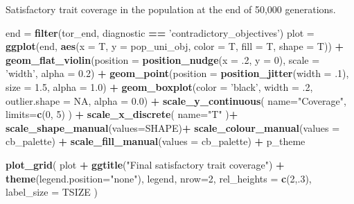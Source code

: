 \documentclass[]{book}
\newenvironment{Shaded}{\begin{snugshade}}{\end{snugshade}}
\newcommand{\DataTypeTok}[1]{\textcolor[rgb]{0.13,0.29,0.53}{#1}}
\newcommand{\DecValTok}[1]{\textcolor[rgb]{0.00,0.00,0.81}{#1}}
\newcommand{\FloatTok}[1]{\textcolor[rgb]{0.00,0.00,0.81}{#1}}
\newcommand{\KeywordTok}[1]{\textcolor[rgb]{0.13,0.29,0.53}{\textbf{#1}}}
\newcommand{\NormalTok}[1]{#1}
\newcommand{\OperatorTok}[1]{\textcolor[rgb]{0.81,0.36,0.00}{\textbf{#1}}}
\newcommand{\OtherTok}[1]{\textcolor[rgb]{0.56,0.35,0.01}{#1}}
\newcommand{\StringTok}[1]{\textcolor[rgb]{0.31,0.60,0.02}{#1}}
\begin{document}
Satisfactory trait coverage in the population at the end of 50,000 generations.

\begin{Shaded}
\begin{Highlighting}[]
\NormalTok{end =}\StringTok{ }\KeywordTok{filter}\NormalTok{(tor_end, diagnostic }\OperatorTok{==}\StringTok{ 'contradictory_objectives'}\NormalTok{)}
\NormalTok{plot =}\StringTok{ }\KeywordTok{ggplot}\NormalTok{(end, }\KeywordTok{aes}\NormalTok{(}\DataTypeTok{x =}\NormalTok{ T, }\DataTypeTok{y =}\NormalTok{ pop_uni_obj, }\DataTypeTok{color =}\NormalTok{ T, }\DataTypeTok{fill =}\NormalTok{ T, }\DataTypeTok{shape =}\NormalTok{ T)) }\OperatorTok{+}
\StringTok{  }\KeywordTok{geom_flat_violin}\NormalTok{(}\DataTypeTok{position =} \KeywordTok{position_nudge}\NormalTok{(}\DataTypeTok{x =} \FloatTok{.2}\NormalTok{, }\DataTypeTok{y =} \DecValTok{0}\NormalTok{), }\DataTypeTok{scale =} \StringTok{'width'}\NormalTok{, }\DataTypeTok{alpha =} \FloatTok{0.2}\NormalTok{) }\OperatorTok{+}
\StringTok{  }\KeywordTok{geom_point}\NormalTok{(}\DataTypeTok{position =} \KeywordTok{position_jitter}\NormalTok{(}\DataTypeTok{width =} \FloatTok{.1}\NormalTok{), }\DataTypeTok{size =} \FloatTok{1.5}\NormalTok{, }\DataTypeTok{alpha =} \FloatTok{1.0}\NormalTok{) }\OperatorTok{+}
\StringTok{  }\KeywordTok{geom_boxplot}\NormalTok{(}\DataTypeTok{color =} \StringTok{'black'}\NormalTok{, }\DataTypeTok{width =} \FloatTok{.2}\NormalTok{, }\DataTypeTok{outlier.shape =} \OtherTok{NA}\NormalTok{, }\DataTypeTok{alpha =} \FloatTok{0.0}\NormalTok{) }\OperatorTok{+}
\StringTok{  }\KeywordTok{scale_y_continuous}\NormalTok{(}
    \DataTypeTok{name=}\StringTok{"Coverage"}\NormalTok{,}
    \DataTypeTok{limits=}\KeywordTok{c}\NormalTok{(}\DecValTok{0}\NormalTok{, }\DecValTok{5}\NormalTok{)}
\NormalTok{  ) }\OperatorTok{+}
\StringTok{  }\KeywordTok{scale_x_discrete}\NormalTok{(}
    \DataTypeTok{name=}\StringTok{"T"}
\NormalTok{  )}\OperatorTok{+}
\StringTok{  }\KeywordTok{scale_shape_manual}\NormalTok{(}\DataTypeTok{values=}\NormalTok{SHAPE)}\OperatorTok{+}
\StringTok{  }\KeywordTok{scale_colour_manual}\NormalTok{(}\DataTypeTok{values =}\NormalTok{ cb_palette) }\OperatorTok{+}
\StringTok{  }\KeywordTok{scale_fill_manual}\NormalTok{(}\DataTypeTok{values =}\NormalTok{ cb_palette) }\OperatorTok{+}
\StringTok{  }\NormalTok{p_theme}

\KeywordTok{plot_grid}\NormalTok{(}
\NormalTok{  plot }\OperatorTok{+}
\StringTok{    }\KeywordTok{ggtitle}\NormalTok{(}\StringTok{"Final satisfactory trait coverage"}\NormalTok{) }\OperatorTok{+}
\StringTok{    }\KeywordTok{theme}\NormalTok{(}\DataTypeTok{legend.position=}\StringTok{"none"}\NormalTok{),}
\NormalTok{  legend,}
  \DataTypeTok{nrow=}\DecValTok{2}\NormalTok{,}
  \DataTypeTok{rel_heights =} \KeywordTok{c}\NormalTok{(}\DecValTok{2}\NormalTok{,.}\DecValTok{3}\NormalTok{),}
  \DataTypeTok{label_size =}\NormalTok{ TSIZE}
\NormalTok{)}
\end{Highlighting}
\end{Shaded}
\end{document}
